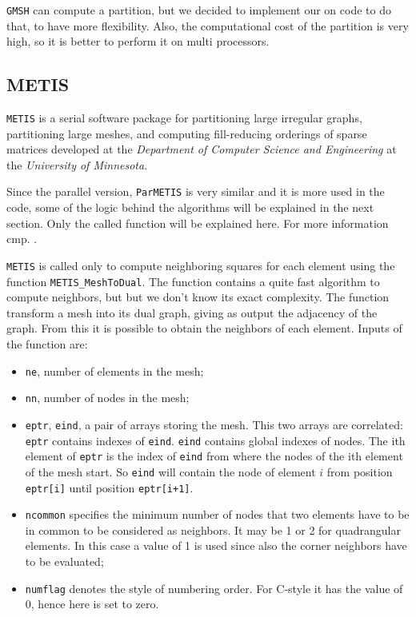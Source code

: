 \verb|GMSH| can compute a partition, but we decided to implement our on code to do that, to have more flexibility. Also, the computational cost of the partition is very high, so it is better to perform it on multi processors.

\subsection{METIS}\label{subsection:metis}
\verb|METIS| is a serial software package for partitioning large irregular graphs, partitioning large meshes, and computing fill-reducing orderings of sparse matrices developed at the 	\textit{Department of Computer Science and Engineering} at the \textit{University of Minnesota}.

Since the parallel version, \verb|ParMETIS| is very similar and it is more used in the code, some of the logic behind the algorithms will be explained in the next section. Only the called function will be explained here. For more information cmp. \cite{metis}.

\verb|METIS| is called only to compute neighboring squares for each element using the function \verb|METIS_MeshToDual|. The function contains a quite fast algorithm to compute neighbors, but but we don't know its exact complexity. The function transform a mesh into its dual graph, giving as output the adjacency of the graph. From this it is possible to obtain the neighbors of each element. Inputs of the function are:

\begin{itemize}
\item \verb|ne|, number of elements in the mesh;
\item \verb|nn|, number of nodes in the mesh;
\item \verb|eptr|, \verb|eind|, a pair of arrays storing the mesh. This two arrays are correlated: \verb|eptr| contains indexes of \verb|eind|. \verb|eind| contains global indexes of nodes. The ith element of \verb|eptr| is the index of \verb|eind| from where the nodes of the ith element of the mesh start. So \verb|eind| will contain the node of element $i$ from position \verb|eptr[i]| until position \verb|eptr[i+1]|.
\item \verb|ncommon| specifies the minimum number of nodes that two elements have to be in common to be considered as neighbors. It may be 1 or 2 for quadrangular elements. In this case a value of 1 is used since also the corner neighbors have to be evaluated;
\item \verb|numflag| denotes the style of numbering order. For C-style it has the value of 0, hence here is set to zero.
\end{itemize}

